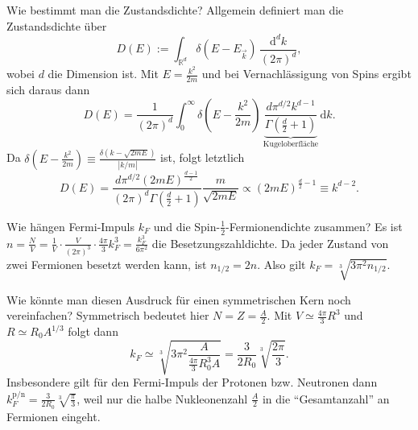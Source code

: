 \begin{fquestion}{Wie bestimmt man die Zustandsdichte?}
    Allgemein definiert man die Zustandsdichte über
    $$D(E) := \int_{\mathbb{R}^d} \delta(E - E_{\Vec{k}})\,\frac{\mathrm{d}^dk}{(2\pi)^d}, $$
    wobei $d$ die Dimension ist.
    Mit $E=\frac{k^2}{2m}$ und bei Vernachlässigung von Spins ergibt sich daraus dann 
    $$D(E) = \frac{1}{(2\pi)^d }\int_0^\infty \delta \left( E - \frac{k^2}{2m} \right)\, \underbrace{\frac{d\pi^{d/2}k^{d-1}}{\Gamma \left(\frac{d}{2} + 1\right) }}_{\text{Kugeloberfläche}} \,\mathrm{d}k.$$
    Da $\delta \left( E - \frac{k^2}{2m} \right) \equiv \frac{\delta (k-\sqrt{2mE})}{|k/m|}$ ist, folgt letztlich
    $$D(E) = \frac{d\pi^{d/2}(2mE)^{\frac{d-1}{2}}}{(2\pi)^d \Gamma \left(\frac{d}{2} + 1\right)} \frac{m}{\sqrt{2mE}} \propto (2mE)^{\frac{d}{2} - 1} \equiv k^{d-2}.$$
    
\end{fquestion}

\begin{fquestion}{Wie hängen Fermi-Impuls $k_F$ und die Spin-$\frac{1}{2}$-Fermionendichte zusammen?}
    Es ist $n=\frac{N}{V} = \frac{1}{V} \cdot \frac{V}{(2\pi)^3}\cdot \frac{4\pi}{3}k_F^3 = \frac{k_F^3}{6\pi^2}$ die Besetzungszahldichte.
    Da jeder Zustand von zwei Fermionen besetzt werden kann, ist $n_{1/2} = 2n$.
    Also gilt $k_F = \sqrt[3]{3\pi^2 n_{1/2}}$.
\end{fquestion}

\begin{fquestion}{Wie könnte man diesen Ausdruck für einen symmetrischen Kern noch vereinfachen?}
    Symmetrisch bedeutet hier $N=Z=\frac{A}{2}$.
    Mit $V\simeq \frac{4\pi}{3} R^3$ und $R\simeq R_0 A^{1/3}$ folgt dann 
    $$k_F \simeq \sqrt[3]{3\pi^2 \frac{A}{\frac{4\pi}{3}R_0^3 A}} = \frac{3}{2R_0}\sqrt[3]{\frac{2\pi}{3} }.$$
    Insbesondere gilt für den Fermi-Impuls der Protonen bzw. Neutronen dann $k_F^{\text{p}/\text{n}} = \frac{3}{2R_0}\sqrt[3]{\frac{\pi}{3} }$, weil nur die halbe Nukleonenzahl $\frac{A}{2}$ in die ``Gesamtanzahl'' an Fermionen eingeht.
\end{fquestion}

